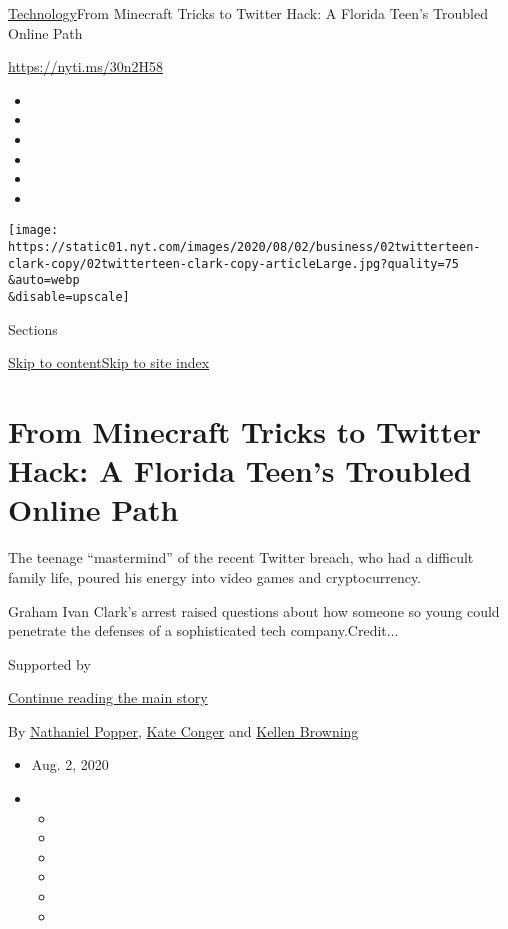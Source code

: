\href{/section/technology}{Technology}\textbar{}From Minecraft Tricks to
Twitter Hack: A Florida Teen's Troubled Online Path

\url{https://nyti.ms/30n2H58}

\begin{itemize}
\item
\item
\item
\item
\item
\item
\end{itemize}

\texttt{[image: https://static01.nyt.com/images/2020/08/02/business/02twitterteen-clark-copy/02twitterteen-clark-copy-articleLarge.jpg?quality=75\\\&auto=webp\\\&disable=upscale]}

Sections

\protect\hyperlink{site-content}{Skip to
content}\protect\hyperlink{site-index}{Skip to site index}

\hypertarget{from-minecraft-tricks-to-twitter-hack-a-florida-teens-troubled-online-path}{%
\section{From Minecraft Tricks to Twitter Hack: A Florida Teen's
Troubled Online
Path}\label{from-minecraft-tricks-to-twitter-hack-a-florida-teens-troubled-online-path}}

The teenage ``mastermind'' of the recent Twitter breach, who had a
difficult family life, poured his energy into video games and
cryptocurrency.

Graham Ivan Clark's arrest raised questions about how someone so young
could penetrate the defenses of a sophisticated tech company.Credit...

Supported by

\protect\hyperlink{after-sponsor}{Continue reading the main story}

By \href{https://www.nytimes.com/by/nathaniel-popper}{Nathaniel Popper},
\href{https://www.nytimes.com/by/kate-conger}{Kate Conger} and
\href{https://www.nytimes.com/by/kellen-browning}{Kellen Browning}

\begin{itemize}
\item
  Aug. 2, 2020
\item
  \begin{itemize}
  \item
  \item
  \item
  \item
  \item
  \item
  \end{itemize}
\end{itemize}

